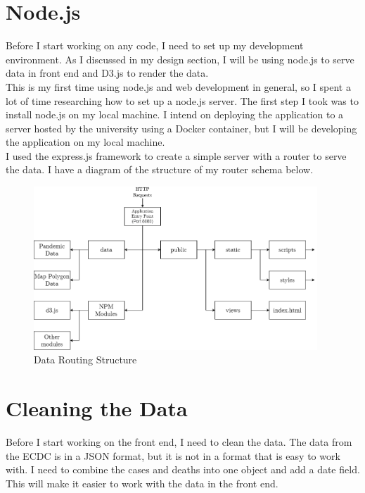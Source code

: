 \documentclass{report}
\begin{document}
\section{Node.js}
Before I start working on any code, I need to set up my development environment. As I discussed in my design section, I will be using node.js to serve data in front end and D3.js to render the data.\\

This is my first time using node.js and web development in general, so I spent a lot of time researching how to set up a node.js server. The first step I took was to install node.js on my local machine. I intend on deploying the application to a server hosted by the university using a Docker container, but I will be developing the application on my local machine.\\

I used the express.js framework to create a simple server with a router to serve the data. I have a diagram of the structure of my router schema below.

\begin{center}
    \begin{figure}[h]
        \centering
        \includegraphics[width=0.95\textwidth]{Images/router_scheme.drawio.png}
        \caption{Data Routing Structure}
        \label{fig:nodejs_structure}
    \end{figure}
\end{center}
\section{Cleaning the Data}
Before I start working on the front end, I need to clean the data. The data from the ECDC is in a JSON format, but it is not in a format that is easy to work with. I need to combine the cases and deaths into one object and add a date field. This will make it easier to work with the data in the front end.
\end{document}
